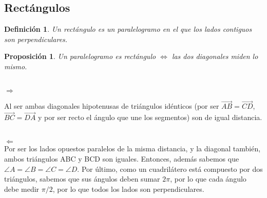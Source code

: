 \documentclass[11pt, a4paper]{article}
\makeatletter
\newif\IfInSansMode
\let\oldsf\sffamily
\renewcommand*{\sffamily}{\oldsf\mathversion{sans}\InSansModetrue}
\let\oldnorm\normalfont
\renewcommand*{\normalfont}{\oldnorm\InSansModefalse\mathversion{normal}}
\renewenvironment{proof}[1][\proofname] {\vspace{-15pt}\par\pushQED{\qed}\normalfont\topsep6\p@\@plus6\p@\relax\trivlist\item[\hskip\labelsep\it#1\@addpunct{.}]\ignorespaces}{\popQED\endtrivlist\@endpefalse}
\renewcommand{\vec}{\overrightarrow}
\renewenvironment{proof}[1][\proofname] {\par\pushQED{\qed}\normalfont\topsep6\p@\@plus6\p@\relax\trivlist\item[\hskip\labelsep\itshape\sffamily#1\@addpunct{.}]\ignorespaces}{\popQED\endtrivlist\@endpefalse}
\theoremstyle{theorem-style}
\newtheorem{nprop}{Proposición}[section]
\theoremstyle{definition-style}
\newtheorem{ndef}{Definición}[section]
\theoremstyle{remark-style}
\theoremstyle{example-style}
\makeatother
\begin{document}
\subsection{Rectángulos}
\begin{ndef}
  Un rectángulo es un paralelogramo en el que los lados contiguos son perpendiculares.
\end{ndef}


\begin{nprop}
  Un paralelogramo es rectángulo $\iff$ las dos diagonales miden lo mismo.
\end{nprop}
\begin{proof}\hfill \\
  $\boxed{\Rightarrow}$\hfill\\
   \begin{minipage}[c]{0.75\textwidth}
  
  Al ser ambas diagonales hipotenusas de triángulos idénticos (por ser $\vec{AB}=\vec{CD}$, $\vec{BC}=\vec{DA}$ y por ser recto el ángulo que une los segmentos) son de igual distancia.\hfill

  \end{minipage}\hfill
  \begin{minipage}[]{0.2\textwidth}
  

  
 
  \end{minipage}\\
  $\boxed{\Leftarrow}$ \\
  Por ser los lados opuestos paralelos de la misma distancia, y la diagonal también, ambos triángulos ABC y BCD son iguales. Entonces, además sabemos que  $\angle A = \angle
 B = \angle C  = \angle D$. Por último, como un cuadrilátero está compuesto por dos triángulos, sabemos que sus ángulos deben sumar $2\pi$, por lo que cada ángulo debe
  medir $\pi/2$, por lo que todos los lados son perpendiculares.
  
\end{proof}
\end{document}
